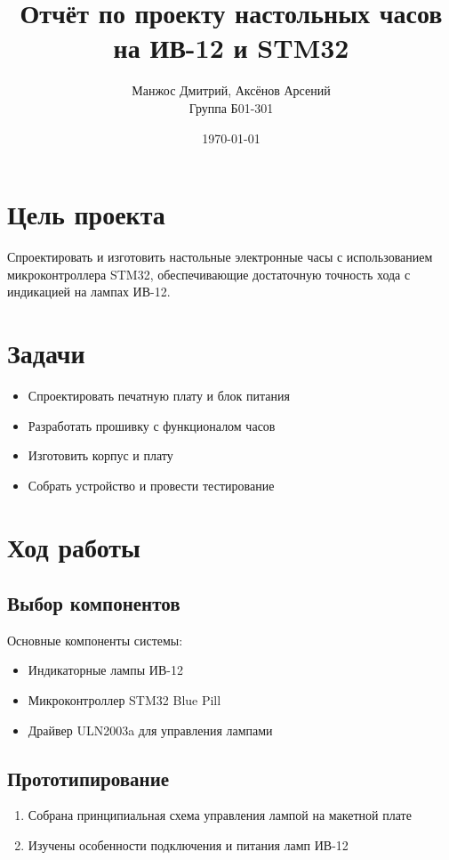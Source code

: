 \documentclass[a4paper,12pt]{article}
\title{Отчёт по проекту настольных часов на ИВ-12 и STM32}
\author{Манжос Дмитрий, Аксёнов Арсений \\ Группа Б01-301}
\date{\today}
\begin{document}
\maketitle

\section{Цель проекта}
Спроектировать и изготовить настольные электронные часы с использованием микроконтроллера STM32, обеспечивающие достаточную точность хода с индикацией на лампах ИВ-12.

\section{Задачи}
\begin{itemize}
    \item Спроектировать печатную плату и блок питания
    \item Разработать прошивку с функционалом часов
    \item Изготовить корпус и плату
    \item Собрать устройство и провести тестирование
\end{itemize}

\section{Ход работы}
\subsection{Выбор компонентов}
Основные компоненты системы:
\begin{itemize}
    \item Индикаторные лампы ИВ-12
    \item Микроконтроллер STM32 Blue Pill
    \item Драйвер ULN2003a для управления лампами
\end{itemize}

\subsection{Прототипирование}
\begin{enumerate}
    \item Собрана принципиальная схема управления лампой на макетной плате
    \item Изучены особенности подключения и питания ламп ИВ-12
\end{enumerate}
\end{document}
